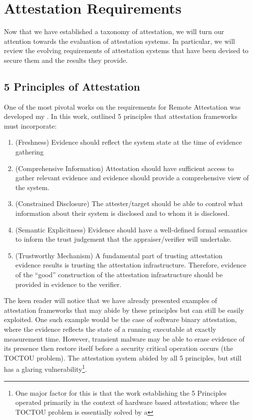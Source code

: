 \documentclass[acmsmall]{acmart}
\theoremstyle{definition}
\begin{document}
\section{Attestation Requirements}
\label{sec:Attestation-Requirements}
Now that we have established a taxonomy of attestation, we will
turn our attention towards the evaluation of attestation systems.
In particular, we will review the evolving requirements of attestation
systems that have been devised to secure them and the results they provide.

\subsection{5 Principles of Attestation}
One of the most pivotal works on the requirements for
Remote Attestation was developed my \citet{Coker::Principles-of-R}.
In this work, \citeauthor{Coker::Principles-of-R} outlined 5 principles that attestation frameworks must incorporate:
\begin{enumerate}
  \item (Freshness) Evidence should reflect the system state at the time of evidence gathering

  \item (Comprehensive Information) Attestation should have sufficient access to gather relevant evidence and evidence should provide a comprehensive view of the system.

  \item (Constrained Disclosure) The attester/target should be able to control what information about their system is disclosed and to whom it is disclosed.

  \item (Semantic Explicitness) Evidence should have a well-defined formal semantics to inform the trust judgement that the appraiser/verifier will undertake.

  \item (Trustworthy Mechanism) A fundamental part of trusting attestation evidence results is trusting the attestation infrastructure. Therefore, evidence of the ``good'' construction of the attestation infrastructure should be provided in evidence to the verifier.
\end{enumerate}
The keen reader will notice that we have already presented examples
of attestation frameworks that may abide by these principles but can
still be easily exploited.
One such example would be the case of software binary attestation,
where the evidence reflects the state of a running executable
at exactly measurement time. However, transient malware may be able to
erase evidence of its presence then restore itself before a
security critical operation occurs (the TOCTOU problem).
The attestation system abided by all 5 principles, but still has a glaring vulnerability\footnote{One major factor for this is that the work establishing the 5 Principles operated primarily in the context of hardware based attestation; where the TOCTOU problem is essentially solved by a }.
\end{document}
